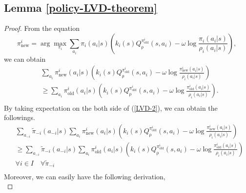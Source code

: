 \documentclass{article}
\begin{document}
	
	
	
	\subsection{Lemma \ref{policy-LVD-theorem}}
	\label{sec:app-them-LVD}
	\begin{proof}
		From the equation 
		\begin{equation*} \label{LVD-1}
			\pi_{\operatorname{new}}^i = \arg \max_{\pi_i} \sum_{a_i} \pi_i (a_i | s) \left( k_i(s) Q_{\operatorname{\rho}}^{\pi^i_{\operatorname{old} }}(s,a_i)  - \omega \log \frac{\pi_i(a_i|s)}{\rho_i(a_i|s)}  \right),
		\end{equation*}
		we can obtain
		\begin{equation}\label{LVD-2}
			\begin{split}
				& \sum_{a_i} \pi_{\operatorname{new}}^i (a_i | s) \left( k_i(s) Q_{\operatorname{\rho}}^{\pi^i_{\operatorname{old} }}(s,a_i)  - \omega \log \frac{\pi_{\operatorname{new}}^i(a_i|s)}{\rho_i(a_i|s)}  \right) \\
				& \ge \sum_{a_i} \pi_{\operatorname{old}}^i (a_i | s) \left( k_i(s) Q_{\operatorname{\rho}}^{\pi^i_{\operatorname{old} }}(s,a_i)  - \omega \log \frac{\pi_{\operatorname{old}}^i(a_i|s)}{\rho_i(a_i|s)}  \right). \\
			\end{split}	
		\end{equation}
		By taking expectation on the both side of (\ref{LVD-2}), we can obtain the followings.
		\begin{equation} \label{LVD-3}
			\begin{split}
				& \sum_{a_{-i}} \tilde{\pi }_{-i}(a_{-i} | s) \sum_{a_i} \pi_{\operatorname{new}}^i (a_i | s) \left( k_i(s) Q_{\operatorname{\rho}}^{\pi^i_{\operatorname{old} }}(s,a_i)  - \omega \log \frac{\pi_{\operatorname{new}}^i(a_i|s)}{\rho_i(a_i|s)}  \right) \\
				& \ge \sum_{a_{-i}} \tilde{\pi }_{-i}(a_{-i} | s) \sum_{a_i} \pi_{\operatorname{old}}^i (a_i | s) \left( k_i(s) Q_{\operatorname{\rho}}^{\pi^i_{\operatorname{old} }}(s,a_i)  - \omega \log \frac{\pi_{\operatorname{old}}^i(a_i|s)}{\rho_i(a_i|s)}  \right) \\ 
				&  \forall i \in I \quad \forall \tilde{\pi }_{-i} \\
			\end{split}	
		\end{equation}
		Moreover, we can easily have the following derivation,
		\begin{equation} \label{LVD-4}

\end{equation}
\end{proof}
\end{document}
